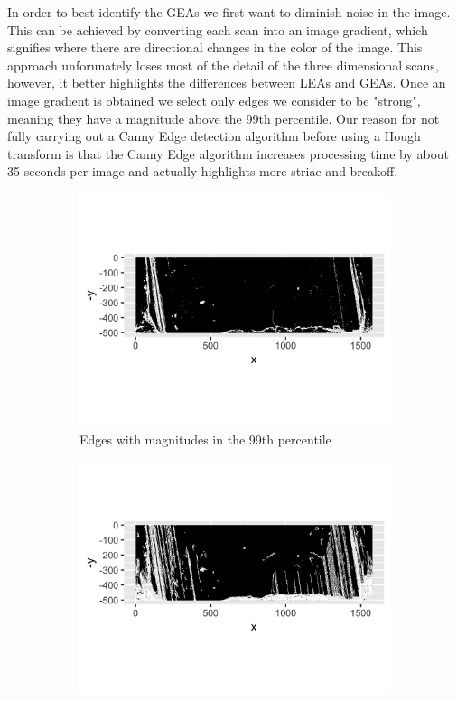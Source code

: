 \documentclass[12pt]{article}
\theoremstyle{nonumberplain}
\begin{document}
In order to best identify the GEAs we first want to diminish noise in the image. This can be achieved by converting each scan into an image gradient, which signifies where there are directional changes in the color of the image. This approach unforunately loses most of the detail of the three dimensional scans, however, it better highlights the differences between LEAs and GEAs. Once an image gradient is obtained we select only edges we consider to be "strong", meaning they have a magnitude above the 99th percentile. Our reason for not fully carrying out a Canny Edge detection algorithm before using a Hough transform is that the Canny Edge algorithm increases processing time by about 35 seconds per image and actually highlights more striae and breakoff. 

\begin{figure}[!ht]
    \centering
    \begin{subfigure}{.5\textwidth}
      \centering
      \includegraphics[width = .9\textwidth]{../images/Hamby252_Bullet1_Land3_Strong_edge.png}
      \caption{Edges with magnitudes in the 99th percentile}
      \label{fig: edge1}
      \end{subfigure}%
    \begin{subfigure}{.5\textwidth}
      \centering
      \includegraphics[width = .9\textwidth]{../images/Hamby252_Bullet1_Land3_Canny_Edge.png}

\end{subfigure}
\end{figure}
\end{document}
